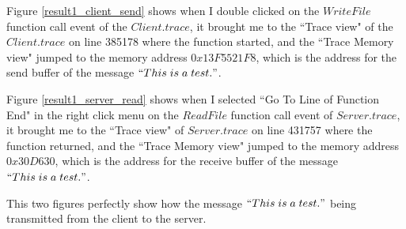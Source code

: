 Figure \ref{result1_client_send} shows when I double clicked on the $WriteFile$ function call event of the $Client.trace$, it brought me to the ``Trace view" of the $Client.trace$ on line 385178 where the function started, and the ``Trace Memory view" jumped to the memory address $0x13F5521F8$, which is the address for the send buffer of the message $``This\; is\; a\; test."$.

Figure \ref{result1_server_read} shows when I selected ``Go To Line of Function End" in the right click menu on the $ReadFile$ function call event of $Server.trace$, it brought me to the ``Trace view" of $Server.trace$ on line 431757 where the function returned, and the ``Trace Memory view" jumped to the memory address $0x30D630$, which is the address for the receive buffer of the message $``This\; is\; a\; test."$.

This two figures perfectly show how the message $``This\; is\; a\; test."$ being transmitted from the client to the server.

